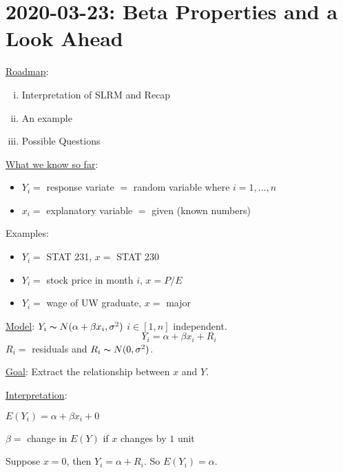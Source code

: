 \section{2020-03-23: Beta Properties and a Look Ahead}
\underline{Roadmap}:
\begin{enumerate}[(i)]
    \item Interpretation of SLRM and Recap
    \item An example
    \item Possible Questions
\end{enumerate}
\underline{What we know so far}:
\begin{itemize}
    \item $ Y_i = $ response variate $ = $ random variable where $ i=1,\ldots ,n $
    \item $ x_i = $ explanatory variable $ = $ given (known numbers)
\end{itemize}
Examples:
\begin{itemize}
    \item $ Y_i = $ STAT 231, $ x= $ STAT 230
    \item $ Y_i= $ stock price in month $ i $, $ x=P/E $
    \item $ Y_i= $ wage of UW graduate, $ x= $ major
\end{itemize}

\underline{Model}: $ Y_i  \thicksim N(\alpha+\beta x_i, \sigma^2) $ $ i\in[1,n] $ independent.
\[ Y_i=\alpha+\beta x_i+R_i \]
$ R_i =  $ residuals and $ R_i \thicksim N(0,\sigma^2) $.

\underline{Goal}: Extract the relationship between $ x $ and $ Y $.

\underline{Interpretation}:

$ E(Y_i)=\alpha+\beta x_i+0 $

$ \beta = $ change in $ E(Y) $ if $ x $ changes by $ 1 $ unit

Suppose $ x=0 $, then $ Y_i=\alpha+R_i $. So $ E(Y_i)=\alpha $.


